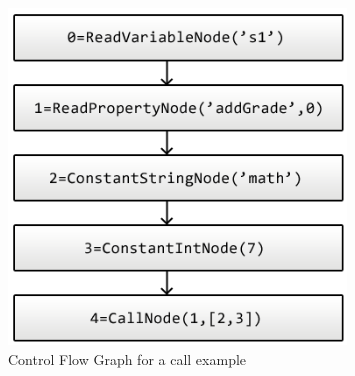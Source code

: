 \begin{figure}[p]
	\centering
	\includegraphics[width=0.8\textwidth]{images/Call-example.png}
	\caption{Control Flow Graph for a call example}
	\label{fig:callCfg}
\end{figure}

